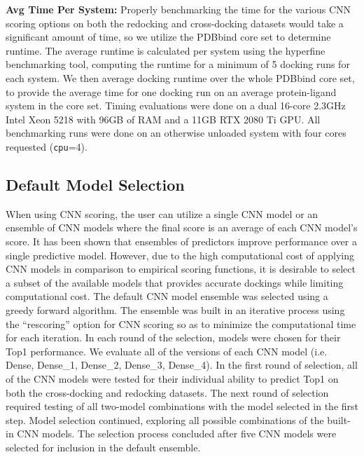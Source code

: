 \documentclass[journal=jcisd8,manuscript=article]{achemso}
\begin{document}
\textbf{Avg Time Per System:}
Properly benchmarking the time for the various CNN scoring options on both the redocking and cross-docking datasets would take a significant amount of time, so we utilize the PDBbind core set to determine runtime. The average runtime is calculated per system using the hyperfine benchmarking tool\cite{hyperfine}, computing the runtime for a minimum of 5 docking runs for each system. We then average docking runtime over the whole PDBbind core set, to provide the average time for one docking run on an average protein-ligand system in the core set. Timing evaluations were done on a dual 16-core 2.3GHz Intel Xeon 5218 with 96GB of RAM and a 11GB RTX 2080 Ti GPU. All benchmarking runs were done on an otherwise unloaded system with four cores requested (\texttt{cpu}=4).

\subsection{Default Model Selection}
When using CNN scoring, the user can utilize a single CNN model or an ensemble of CNN models where the final score is an average of each CNN model's score. It has been shown that ensembles of predictors improve performance over a single predictive model\cite{dietterich2000ensemble}. However, due to the high computational cost of applying CNN models in comparison to empirical scoring functions, it is desirable to select a subset of the available models that provides accurate dockings while limiting computational cost. The default CNN model ensemble was selected using a greedy forward algorithm. The ensemble was built in an iterative process using the ``rescoring'' option for CNN scoring so as to minimize the computational time for each iteration. In each round of the selection, models were chosen for their Top1 performance. We evaluate all of the versions of each CNN model (i.e. Dense, Dense\_1, Dense\_2, Dense\_3, Dense\_4). In the first round of selection, all of the CNN models were tested for their individual ability to predict Top1 on both the cross-docking and redocking datasets. The next round of selection required testing of all two-model combinations with the model selected in the first step. Model selection continued, exploring all possible combinations of the built-in CNN models. The selection process concluded after five CNN models were selected for inclusion in the default ensemble.
\end{document}
